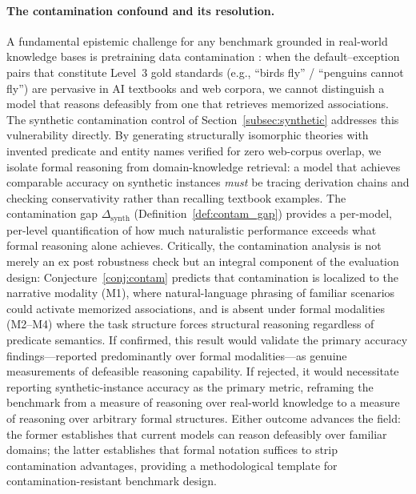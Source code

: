 \documentclass{article}
\theoremstyle{definition}
\begin{document}
\paragraph{The contamination confound and its resolution.} A fundamental epistemic challenge for any benchmark grounded in real-world knowledge bases is pretraining data contamination \cite{zhang2024gsm1k, jain2025livecodebench}: when the default--exception pairs that constitute Level~3 gold standards (e.g., ``birds fly'' / ``penguins cannot fly'') are pervasive in AI textbooks and web corpora, we cannot distinguish a model that reasons defeasibly from one that retrieves memorized associations. The synthetic contamination control of Section~\ref{subsec:synthetic} addresses this vulnerability directly. By generating structurally isomorphic theories with invented predicate and entity names verified for zero web-corpus overlap, we isolate formal reasoning from domain-knowledge retrieval: a model that achieves comparable accuracy on synthetic instances \emph{must} be tracing derivation chains and checking conservativity rather than recalling textbook examples. The contamination gap $\Delta_{\mathrm{synth}}$ (Definition~\ref{def:contam_gap}) provides a per-model, per-level quantification of how much naturalistic performance exceeds what formal reasoning alone achieves. Critically, the contamination analysis is not merely an ex post robustness check but an integral component of the evaluation design: Conjecture~\ref{conj:contam} predicts that contamination is localized to the narrative modality (M1), where natural-language phrasing of familiar scenarios could activate memorized associations, and is absent under formal modalities (M2--M4) where the task structure forces structural reasoning regardless of predicate semantics. If confirmed, this result would validate the primary accuracy findings---reported predominantly over formal modalities---as genuine measurements of defeasible reasoning capability. If rejected, it would necessitate reporting synthetic-instance accuracy as the primary metric, reframing the benchmark from a measure of reasoning over real-world knowledge to a measure of reasoning over arbitrary formal structures. Either outcome advances the field: the former establishes that current models can reason defeasibly over familiar domains; the latter establishes that formal notation suffices to strip contamination advantages, providing a methodological template for contamination-resistant benchmark design.
\end{document}
